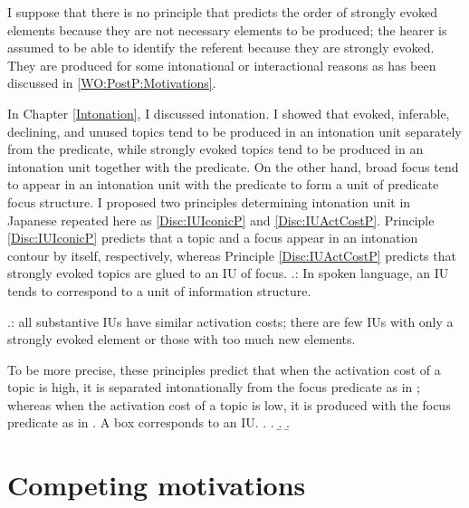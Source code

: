 I suppose that there is no principle that predicts the order of strongly evoked elements because they are not necessary elements to be produced;
the hearer is assumed to be able to identify the referent
because they are strongly evoked.
They are produced for some intonational or interactional reasons
as has been discussed in \ref{WO:PostP:Motivations}.

In Chapter \ref{Intonation},
I discussed intonation.
I showed that
evoked, inferable, declining, and unused topics tend to be produced in an intonation unit separately from the predicate,
while strongly evoked topics tend to be produced in an intonation unit together with the predicate.
On the other hand,
broad focus tend to appear in an intonation unit with the predicate
to form a unit of predicate focus structure.
I proposed two principles determining intonation unit in Japanese
repeated here as \ref{Disc:IUIconicP} and \ref{Disc:IUActCostP}.
Principle \ref{Disc:IUIconicP} predicts that
a topic and a focus appear in an intonation contour by itself, respectively,
whereas Principle \ref{Disc:IUActCostP} predicts that
strongly evoked topics are glued to an IU of focus.
%
\ex.\label{Disc:IUIconicP}:
	In spoken language,
	an IU tends to correspond to a unit of information structure.

\ex.\label{Disc:IUActCostP}:
     all substantive IUs have similar activation costs;
     there are few IUs with only a strongly evoked element or
     those with too much new elements.

To be more precise, these principles predict that
when the activation cost of a topic is high,
it is separated intonationally from the focus predicate as in \Next[a];
whereas when the activation cost of a topic is low,
it is produced with the focus predicate as in \Next[b-c].
A box corresponds to an IU.
%
\ex.
 \a.  
 \b. 
 \b. 

\section{Competing motivations}\label{Disc:CompMotivations}

